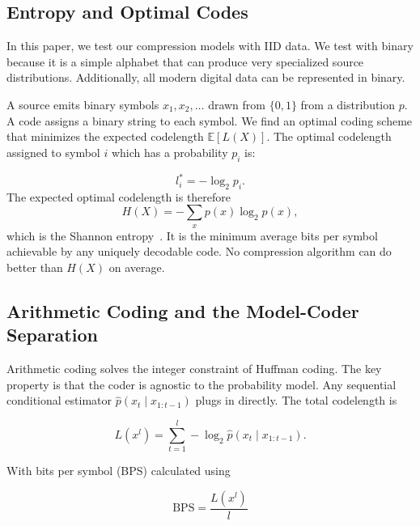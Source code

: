 \documentclass[onecolumn,english,12pt]{IEEEtran}
\theoremstyle{plain}
\theoremstyle{plain}
\theoremstyle{plain}
\theoremstyle{definition}
\begin{document}
\subsection{Entropy and Optimal Codes}
\label{sec:entropy}

In this paper, we test our compression models with IID data. We test with binary because it is a simple alphabet that can produce very specialized source distributions. Additionally, all modern digital data can be represented in binary.

A source emits binary symbols
$x_1, x_2, \ldots$ drawn from $\{0, 1\}$ from a distribution $p$. A code assigns
a binary string to each symbol. We find an optimal coding scheme that minimizes the expected
codelength $\mathbb{E}[L(X)]$. The optimal codelength assigned to symbol $i$ which has a probability $p_i$ is: 

\begin{equation}
  l_i^* = -\log_2 p_i.
  \label{eq:optlen}
\end{equation}
The expected optimal codelength is therefore
\begin{equation}
  H(X) = -\sum_x p(x)\log_2 p(x),
  \label{eq:entropy}
\end{equation}
which is the Shannon entropy~\cite{CoverThomas}. It is the
minimum average bits per symbol achievable by any uniquely decodable
code. No compression algorithm can do better than $H(X)$ on average.

\subsection{Arithmetic Coding and the Model-Coder Separation}
\label{sec:arith}

Arithmetic coding solves the integer constraint of Huffman coding. The key property is that the coder is agnostic to the probability model.
Any sequential conditional estimator $\hat{p}(x_t \mid x_{1:t-1})$
plugs in directly. The total codelength is

\begin{equation}
  L(x^l) = \sum_{t=1}^{l} -\log_2 \hat{p}(x_t \mid x_{1:t-1}).
  \label{eq:codelength}
\end{equation}

With bits per symbol (BPS) calculated using

\begin{equation}
  \mathrm{BPS} = \frac{L(x^l)}{l}
  \label{eq:bps}
\end{equation}
\end{document}

